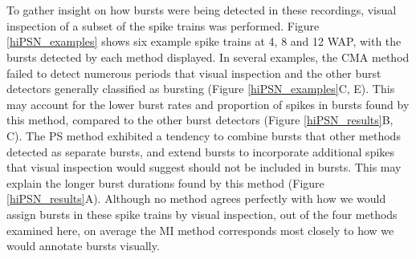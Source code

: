 \documentclass[12pt, titlepage]{article}
\begin{document}
	\\ \\ To gather insight on how bursts were being detected in these recordings, visual inspection of a subset of the spike trains was performed.  Figure \ref{hiPSN_examples} shows six example spike trains at 4, 8 and 12 WAP, with the bursts detected by each method displayed. In several examples, the CMA method failed to detect numerous periods that visual inspection and the other burst detectors generally classified as bursting (Figure \ref{hiPSN_examples}C, E). This may account for the lower burst rates and proportion of spikes in bursts found by this method, compared to the other burst detectors (Figure \ref{hiPSN_results}B, C). The PS method exhibited a tendency to combine bursts that other methods detected as separate bursts, and extend bursts to incorporate additional spikes that visual inspection would suggest should not be included in bursts. This may explain the longer burst durations found by this method (Figure \ref{hiPSN_results}A). Although no method agrees perfectly with how we would assign bursts in these spike trains by visual inspection, out of the four methods examined here, on average the MI method corresponds most closely to how we would annotate bursts visually.
\end{document}
